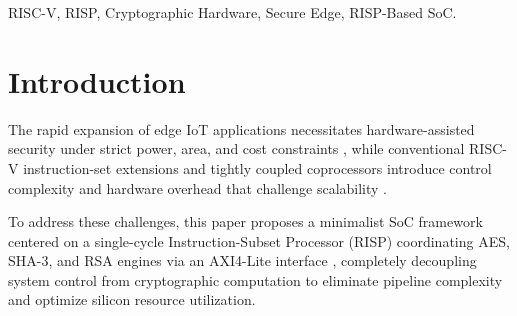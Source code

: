 \begin{abstract}

The rapid proliferation of IoT edge applications demands compact, energy-efficient SoCs capable of operating under strict constraints. To avoid the hardware overhead of conventional cryptographic ISA or pipeline extensions, this paper presents a RISP-based SoC framework integrating a minimalist single-cycle processor core with dedicated AES, SHA-3, and RSA cryptographic engines via an AXI4-Lite interface. Implemented on a Xilinx Zynq-7000 FPGA, the RISP core minimizes control logic to just $1,120\text{ }\text{LUTs}$ and $170\text{ }\text{FFs}$. Benchmarked against RV32I and Ibex baselines, the RISP-based SoC reduces total power to $0.413\text{ }\text{W}$ ($0.304\text{ }\text{W}$ dynamic) and drastically cuts cycle counts across all cryptographic workloads. Specifically, it achieves $58.18 Mb/s$ in AES-128 ECB mode ($88\text{ }\text{cycles}$), completes 16-block SHA-3-256 in $6,871\text{ }\text{cycles}$, and delivers $3314.04\text{ }\mu\text{J/bit}$ energy efficiency with $301.75$ verifications per second per Watt ($\text{verifications} \cdot \text{s}^{-1} \cdot \text{W}^{-1}$) for $\text{RSA}\text{-}2048$. The proposed architecture provides an optimal hardware offloading paradigm for energy-constrained secure edge computing.

\end{abstract}


\begin{IEEEkeywords}
RISC-V, RISP, Cryptographic Hardware, Secure Edge, RISP-Based SoC.
\end{IEEEkeywords}

\section{Introduction}
\label{sec:intro}

The rapid expansion of edge IoT applications necessitates hardware-assisted security under strict power, area, and cost constraints \cite{wang2021energy}, while conventional RISC-V instruction-set extensions and tightly coupled coprocessors introduce control complexity and hardware overhead that challenge scalability \cite{wang2021energy, pham2026sha, pham2024secure, ignatius2024power}.

To address these challenges, this paper proposes a minimalist SoC framework centered on a single-cycle Instruction-Subset Processor (RISP) coordinating AES, SHA-3, and RSA engines via an AXI4-Lite interface \cite{raissp2025}, completely decoupling system control from cryptographic computation to eliminate pipeline complexity and optimize silicon resource utilization.

